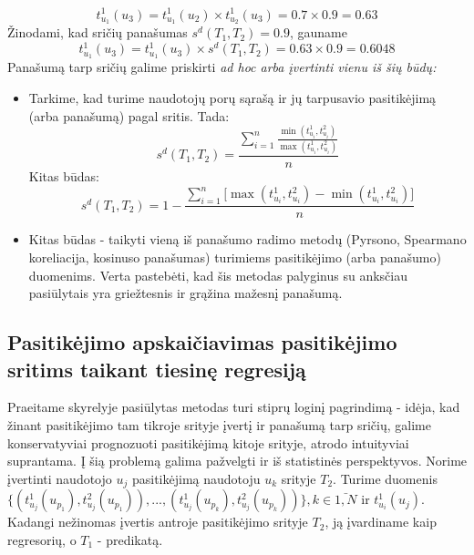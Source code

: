 \documentclass{VUMIFInfMagistrinis}
\begin{document}
\begin{displaymath}
t_{u_1}^1(u_3)=t_{u_1}^1(u_2) \times t_{u_2}^1(u_3) = 0.7 \times 0.9 = 0.63
\end{displaymath}
Žinodami, kad sričių panašumas $s^d(T_1, T_2) = 0.9$, gauname
\begin{displaymath}
t_{u_1}^1(u_3)=t_{u_1}^1(u_3) \times s^d(T_1, T_2) = 0.63 \times 0.9 = 0.6048
\end{displaymath}
Panašumą tarp sričių galime priskirti \it{ad hoc} \normalfont arba įvertinti vienu iš šių būdų:
\begin{itemize}
	\item Tarkime, kad turime naudotojų porų sąrašą ir jų tarpusavio pasitikėjimą (arba panašumą) pagal sritis. Tada:
	\begin{displaymath}\label{eq:areasim}
	s^d(T_1, T_2) = \frac{\sum \limits_{i=1}^n \frac{\min(t_{u_i}^1, t_{u_i}^2)}{\max(t_{u_i}^1, t_{u_i}^2)}}{n}
	\end{displaymath}
	\indent
	Kitas būdas:
	\begin{displaymath}\label{eq:areasim}
	s^d(T_1, T_2) = 1-\frac{\sum \limits_{i=1}^n \big[\max(t_{u_i}^1, t_{u_i}^2)- \min(t_{u_i}^1, t_{u_i}^2)\big]}{n}
	\end{displaymath}
	\item Kitas būdas - taikyti vieną iš panašumo radimo metodų (Pyrsono, Spearmano koreliacija, kosinuso panašumas) turimiems pasitikėjimo (arba panašumo) duomenims. Verta pastebėti, kad šis metodas palyginus su anksčiau pasiūlytais yra griežtesnis ir grąžina mažesnį panašumą.
\end{itemize} 
\subsection{Pasitikėjimo apskaičiavimas pasitikėjimo sritims taikant tiesinę regresiją}\label{ssec:linreg}
Praeitame skyrelyje pasiūlytas metodas turi stiprų loginį pagrindimą - idėja, kad žinant pasitikėjimo tam tikroje srityje įvertį ir panašumą tarp sričių, galime konservatyviai prognozuoti pasitikėjimą kitoje srityje, atrodo intuityviai suprantama. Į šią problemą galima pažvelgti ir iš statistinės perspektyvos. Norime įvertinti naudotojo $u_j$ pasitikėjimą naudotoju $u_k$ srityje $T_2$. Turime duomenis $\{(t_{u_j}^1(u_{p_1}), t_{u_j}^2(u_{p_1})),... , (t_{u_j}^1(u_{p_k}), t_{u_j}^2(u_{p_k}))\}, k \in \bar{1,N} $ ir $t_{u_i}^1(u_j)$. Kadangi nežinomas įvertis antroje pasitikėjimo srityje $T_2$, ją įvardiname kaip regresorių, o $T_1$ - predikatą.
\end{document}
